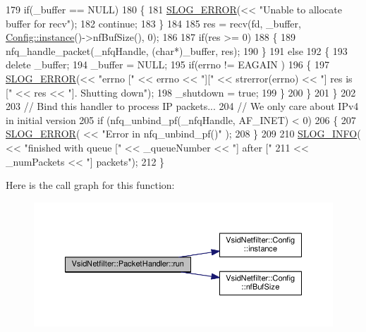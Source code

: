 \begin{DoxyCode}
179         \textcolor{keywordflow}{if}(\_buffer == NULL)
180         \{
181             \hyperlink{_logger_8h_a2a8694cd392d18f4db6b9cc9f15bafe3}{SLOG\_ERROR}(<< \textcolor{stringliteral}{"Unable to allocate buffer for recv"});
182             \textcolor{keywordflow}{continue};
183         \}
184 
185         res = recv(fd, \_buffer, \hyperlink{class_vsid_netfilter_1_1_config_abf1d4539011ef83cac0fef2ac864a3a9}{Config::instance}()->nfBufSize(), 0);
186 
187         \textcolor{keywordflow}{if}(res >= 0)
188         \{
189             nfq\_handle\_packet(\_nfqHandle, (\textcolor{keywordtype}{char}*)\_buffer, res);
190         \}
191         \textcolor{keywordflow}{else}
192         \{
193             \textcolor{keyword}{delete} \_buffer;
194             \_buffer = NULL;
195             \textcolor{keywordflow}{if}(errno != EAGAIN )
196             \{
197                 \hyperlink{_logger_8h_a2a8694cd392d18f4db6b9cc9f15bafe3}{SLOG\_ERROR}(<< \textcolor{stringliteral}{"errno ["} << errno << \textcolor{stringliteral}{"]["} << strerror(errno) << \textcolor{stringliteral}{"] res is ["} << 
      res << \textcolor{stringliteral}{"]. Shutting down"});
198                 \_shutdown = \textcolor{keyword}{true};
199             \}
200         \}
201     \}
202 
203     \textcolor{comment}{// Bind this handler to process IP packets...}
204     \textcolor{comment}{// We only care about IPv4 in initial version}
205     \textcolor{keywordflow}{if} (nfq\_unbind\_pf(\_nfqHandle, AF\_INET) < 0) 
206     \{
207         \hyperlink{_logger_8h_a2a8694cd392d18f4db6b9cc9f15bafe3}{SLOG\_ERROR}( << \textcolor{stringliteral}{"Error in nfq\_unbind\_pf()"} );
208     \}
209 
210     \hyperlink{_logger_8h_a119c1c29ba35a8db38e2358e41167282}{SLOG\_INFO}( << \textcolor{stringliteral}{"finished with queue ["} << \_queueNumber << \textcolor{stringliteral}{"] after ["} 
211                 << \_numPackets << \textcolor{stringliteral}{"] packets"});
212 \}
\end{DoxyCode}


Here is the call graph for this function\-:
\nopagebreak
\begin{figure}[H]
\begin{center}
\leavevmode
\includegraphics[width=350pt]{class_vsid_netfilter_1_1_packet_handler_a351a43a68f29a0f19a7baccebe1397e9_cgraph}
\end{center}
\end{figure}


